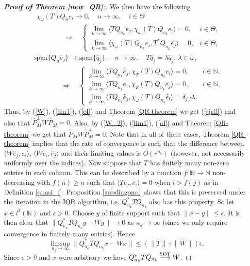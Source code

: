 \documentclass[a4paper,10pt]{article}
\begin{document}
\begin{proof}[\textbf{Proof of Theorem \ref{new_QR}}:]
We then have the following 
\begin{equation}\label{lim1}
\begin{split}
&\chi_{\omega}(T)Q_ne_i\rightarrow 0,  \quad n \rightarrow \infty, \quad i \in \Theta \\
&\qquad\qquad\Longrightarrow \quad 
\begin{cases}
\lim_{k\rightarrow \infty}\langle TQ_{n_k} \hat e_j, \chi_{\omega}(T)Q_{n_k} e_i \rangle = 0, & i \in \Theta,\\
\lim_{k\rightarrow \infty}\langle \chi_{\omega}(T)Q_{n_k} e_i, T^*Q_{n_k} \hat e_j \rangle  = 0, & i \in \Theta,
\end{cases}
\end{split}
\end{equation}
\begin{equation}\label{ol}
\begin{split}
&\mathrm{span}\{Q_n \hat e_j\} \rightarrow
\mathrm{span}\{\hat q_j\}, \quad n \rightarrow \infty, \quad T\hat q_j = \lambda \hat q_j, \, \lambda \in \omega, \\
&\qquad\qquad\Longrightarrow \quad 
\begin{cases}
\lim_{k\rightarrow \infty}\langle TQ_{n_k} \hat e_j, \chi_{\Psi}(T) Q_{n_k}e_i \rangle = 0, & i \in \mathbb{N},\\
\lim_{k\rightarrow \infty}\langle T Q_{n_k} e_i, \chi_{\Psi}(T)Q_{n_k} \hat e_j \rangle = 0, & i \in \mathbb{N},\\
 \lim_{k\rightarrow \infty}\langle TQ_{n_k} \hat e_j, \chi_{\omega}(T)Q_{n_k} \hat e_l \rangle = \delta_{j,l} \lambda.
\end{cases}
\end{split}
\end{equation}
Thus, by (\ref{W}), (\ref{lim1}), (\ref{ol}) and Theorem \ref{QR-theorem} we get (\ref{tjall}) and also that $\widehat P_M^{\perp}W \widehat P_M = 0$. Also, by (\ref{W_2}), (\ref{lim1}), (\ref{ol}) and Theorem \ref{QR-theorem} we get that $\widehat P_MW \widehat P_M^{\perp} = 0$. Note that in all of these cases, Theorem \ref{QR-theorem} implies that the rate of convergence is such that the difference between $\langle W \hat e_j, e_i \rangle$, $\langle W e_i,\hat e_j \rangle$ and their limiting values is $O(r^{n_k})$ (however, not necessarily uniformly over the indices). Now suppose that $T$ has finitely many non-zero entries in each column. This can be described by a function $f:\mathbb{N}\rightarrow\mathbb{N}$ non-decreasing with $f(n)\geq n$ such that $\langle Te_j,e_i\rangle = 0$ when $i > f(j)$ as in Definition \ref{quasi_f}. Proposition \ref{subdiagonal} shows that this is preserved under the iteration in the IQR algorithm, i.e. $Q_{n_k}^*TQ_{n_k}$ also has this property. So let $x\in l^2(\mathbb{N})$ and $\epsilon>0$. Choose $y$ of finite support such that $\|x-y\|\leq \epsilon$. It is then clear that $\|Q_{n_k}^*TQ_{n_k}y-Wy\|\rightarrow 0$ as $n_k\rightarrow\infty$ (since we only require convergence in finitely many entries). Hence
$$
\limsup_{n_k\rightarrow\infty}\|Q_{n_k}^*TQ_{n_k}x-Wx\|\leq (\|T\|+\|W\|)\epsilon.
$$
Since $\epsilon>0$ and $x$ were arbitrary we have $ Q_{n_k}^*TQ_{n_k} \stackrel{\text{\scriptsize SOT}}{\longrightarrow} W$.


\end{proof}
\end{document}
